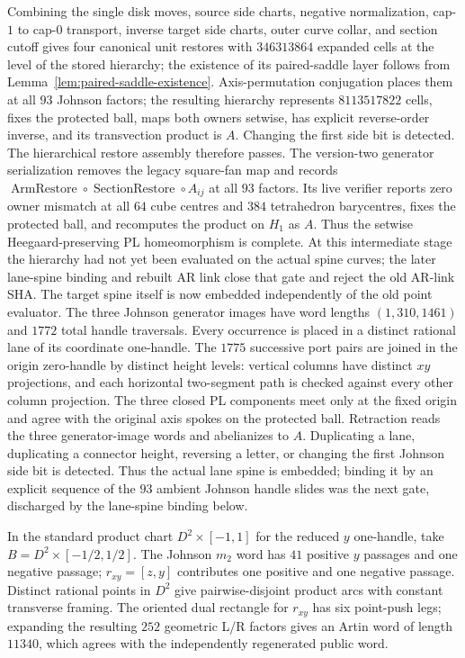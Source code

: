 \documentclass[11pt]{amsart}
\theoremstyle{definition}
\theoremstyle{remark}
\begin{document}
Combining the single disk moves, source side charts, negative normalization,
cap-$1$ to cap-$0$ transport, inverse target side charts, outer curve collar,
and section cutoff gives four canonical unit restores with $346313864$
expanded cells at the level of the stored hierarchy; the existence of its
paired-saddle layer follows from Lemma~\ref{lem:paired-saddle-existence}.
Axis-permutation conjugation places them at all $93$ Johnson
factors; the resulting hierarchy represents $8113517822$ cells, fixes the
protected ball, maps both owners setwise, has explicit reverse-order inverse,
and its transvection product is $A$.  Changing the first side bit is detected.
The hierarchical restore assembly therefore passes.  The version-two
generator serialization removes the legacy square-fan map and records
$\operatorname{ArmRestore}\circ\operatorname{SectionRestore}\circ A_{ij}$ at
all $93$ factors.  Its live verifier reports zero owner mismatch at all $64$
cube centres and $384$ tetrahedron barycentres, fixes the protected ball, and
recomputes the product on $H_1$ as $A$.  Thus the setwise Heegaard-preserving
PL homeomorphism is complete.  At this intermediate stage the hierarchy had
not yet been evaluated on the actual spine curves; the later lane-spine
binding and rebuilt AR link close that gate and reject the old AR-link SHA.
The target spine itself is now embedded independently of the old point
evaluator.  The three Johnson generator images have word lengths
$(1,310,1461)$ and $1772$ total handle traversals.  Every occurrence is placed
in a distinct rational lane of its coordinate one-handle.  The $1775$
successive port pairs are joined in the origin zero-handle by distinct height
levels: vertical columns have distinct $xy$ projections, and each horizontal
two-segment path is checked against every other column projection.  The three
closed PL components meet only at the fixed origin and agree with the original
axis spokes on the protected ball.  Retraction reads the three generator-image
words and abelianizes to $A$.  Duplicating a lane, duplicating a connector
height, reversing a letter, or changing the first Johnson side bit is detected.
Thus the actual lane spine is embedded; binding it by an explicit sequence of
the $93$ ambient Johnson handle slides was the next gate, discharged by the
lane-spine binding below.

In the standard product chart $D^2\times[-1,1]$ for the reduced $y$
one-handle, take $B=D^2\times[-1/2,1/2]$.  The Johnson $m_2$ word has $41$
positive $y$ passages and one negative passage; $r_{xy}=[z,y]$ contributes one
positive and one negative passage.  Distinct rational points in $D^2$ give
pairwise-disjoint product arcs with constant transverse framing.  The oriented
dual rectangle for $r_{xy}$ has six point-push legs; expanding the resulting
$252$ geometric L/R factors gives an Artin word of length $11340$, which
agrees with the independently regenerated public word.
\end{document}
